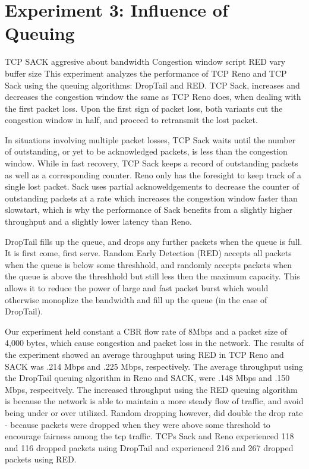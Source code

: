 \section{Experiment 3: Influence of Queuing}
TCP SACK aggresive about bandwidth
Congestion window script 
RED vary buffer size
This experiment analyzes the performance of TCP Reno and TCP Sack using the queuing algorithms: DropTail and RED. TCP Sack, increases and decreases the congestion window the same as TCP Reno does, when dealing with the first packet loss. Upon the first sign of packet loss, both variants cut the congestion window in half, and proceed to retransmit the lost packet. 

In situations involving multiple packet losses, TCP Sack waits until the number of outstanding, or yet to be acknowledged packets, is less than the congestion window. While in fast recovery, TCP Sack keeps a record of outstanding packets as well as a corresponding counter. Reno only has the foresight to keep track of a single lost packet. Sack uses partial acknoweldgements to decrease the counter of outstanding packets at a rate which increases the congestion window faster than slowstart, which is why the performance of Sack benefits from a slightly higher throughput and a slightly lower latency than Reno.

DropTail fills up the queue, and drops any further packets when the queue is full. It is first come, first serve. Random Early Detection (RED) accepts all packets when the queue is below some threshhold, and randomly accepts packets when the queue is above the threshhold but still less then the maximum capacity. This allows it to reduce the power of large and fast packet burst which would otherwise monoplize the bandwidth and fill up the queue (in the case of DropTail).

Our experiment held constant a CBR flow rate of 8Mbps and a packet size of 4,000 bytes, which cause congestion and packet loss in the network. The results of the experiment showed an average throughput using RED in TCP Reno and SACK was .214 Mbps and .225 Mbps, respectively. The average throughput using the DropTail queuing algorithm in Reno and SACK, were .148 Mbps and .150 Mbps, respecitvely. The increased throughput using the RED queuing algorithm is because the network is able to maintain a more steady flow of traffic, and avoid being under or over utilized. Random dropping however, did double the drop rate - because packets were dropped when they were above some threshold to encourage fairness among the tcp traffic. TCPs Sack and Reno experienced 118 and 116 dropped packets using DropTail and experienced 216 and 267 dropped packets using RED.

